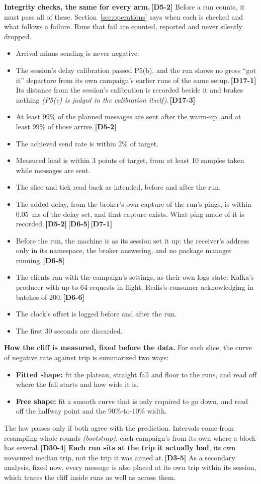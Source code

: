 \documentclass[11pt]{article}
\newcommand{\gl}[1]{{\color{soft}\itshape\small (#1)}}
\newcommand{\chg}[1]{\,{\color{chgcol}\bfseries\footnotesize[#1]}}
\newcommand{\chgold}[1]{\,{\color{oldcol}\bfseries\footnotesize[#1]}}
\begin{document}
\textbf{Integrity checks, the same for every arm.}\chgold{D5-2} Before a run counts, it must pass all of these. Section~\ref{sec:operations} says when each is checked and what follows a failure. Runs that fail are counted, reported and never silently dropped.
\begin{itemize}
  \item Arrival minus sending is never negative.
  \item The session's delay calibration passed P5(b), and the run shows no gross ``got it'' departure from its own campaign's earlier runs of the same setup.\chgold{D17-1} Its distance from the session's calibration is recorded beside it and brakes nothing \gl{P5(c) is judged in the calibration itself}.\chgold{D17-3}
  \item At least 99\% of the planned messages are sent after the warm-up, and at least 99\% of those arrive.\chgold{D5-2}
  \item The achieved send rate is within 2\% of target.
  \item Measured load is within 3 points of target, from at least 10 samples taken while messages are sent.
  \item The slice and tick read back as intended, before and after the run.
  \item The added delay, from the broker's own capture of the run's pings, is within 0.05~ms of the delay set, and that capture exists. What ping made of it is recorded.\chgold{D5-2}\chgold{D6-5}\chgold{D7-1}
  \item Before the run, the machine is as its session set it up: the receiver's address only in its namespace, the broker answering, and no package manager running.\chgold{D6-8}
  \item The clients ran with the campaign's settings, as their own logs state: Kafka's producer with up to 64 requests in flight, Redis's consumer acknowledging in batches of 200.\chgold{D6-6}
  \item The clock's offset is logged before and after the run.
  \item The first 30 seconds are discarded.
\end{itemize}

\textbf{How the cliff is measured, fixed before the data.} For each slice, the curve of negative rate against trip is summarized two ways:
\begin{itemize}
  \item \textbf{Fitted shape:} fit the plateau, straight fall and floor to the runs, and read off where the fall starts and how wide it is.
  \item \textbf{Free shape:} fit a smooth curve that is only required to go down, and read off the halfway point and the 90\%-to-10\% width.
\end{itemize}
The law passes only if both agree with the prediction. Intervals come from resampling whole rounds \gl{bootstrap}, each campaign's from its own where a block has several.\chg{D30-4} \textbf{Each run sits at the trip it actually had}, its own measured median trip, not the trip it was aimed at.\chgold{D3-5} As a secondary analysis, fixed now, every message is also placed at its own trip within its session, which traces the cliff inside runs as well as across them.
\end{document}
